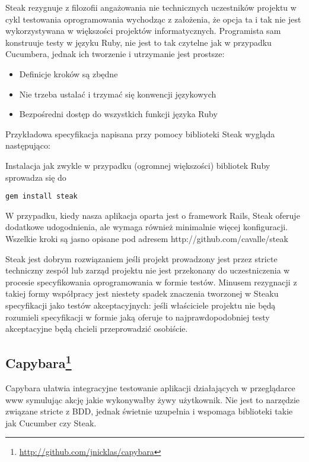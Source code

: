       Steak rezygnuje z filozofii angażowania nie technicznych uczestników projektu w cykl testowania oprogramowania wychodząc z założenia, że opcja ta i tak nie jest wykorzystywana w większości projektów informatycznych. Programista sam konstruuje testy w języku Ruby, nie jest to tak czytelne jak w przypadku Cucumbera, jednak ich tworzenie i utrzymanie jest prostsze:
      
      \begin{itemize}
        \item Definicje kroków są zbędne
        \item Nie trzeba ustalać i trzymać się konwencji językowych
        \item Bezpośredni dostęp do wszystkich funkcji języka Ruby
      \end{itemize}
      
      Przykładowa specyfikacja napisana przy pomocy biblioteki Steak wygląda następująco:
      
      
      
      Instalacja jak zwykle w przypadku (ogromnej większości) bibliotek Ruby sprowadza się do
      
\begin{lstlisting}
gem install steak
\end{lstlisting}
      
      W przypadku, kiedy nasza aplikacja oparta jest o framework Rails, Steak oferuje dodatkowe udogodnienia, ale wymaga również minimalnie więcej konfiguracji. Wszelkie kroki są jasno opisane pod adresem http://github.com/cavalle/steak
      
      Steak jest dobrym rozwiązaniem jeśli projekt prowadzony jest przez stricte techniczny zespół lub zarząd projektu nie jest przekonany do uczestniczenia w procesie specyfikowania oprogramowania w formie testów. Minusem rezygnacji z takiej formy współpracy jest niestety spadek znaczenia tworzonej w Steaku specyfikacji jako testów akceptacyjnych: jeśli właściciele projektu nie będą rozumieli specyfikacji w formie jaką oferuje to najprawdopodobniej testy akceptacyjne będą chcieli przeprowadzić osobiście.
    
    \subsection[Capybara]{Capybara\footnote{\url{http://github.com/jnicklas/capybara}}}  

      Capybara ułatwia integracyjne testowanie aplikacji działających w przeglądarce www symulując akcję jakie wykonywałby żywy użytkownik. Nie jest to narzędzie związane stricte z BDD, jednak świetnie uzupełnia i wspomaga biblioteki takie jak Cucumber czy Steak.
      
